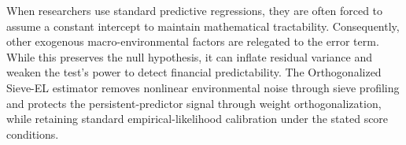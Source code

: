 \documentclass{article}
\begin{document}
When researchers use standard predictive regressions, they are often forced to assume a constant intercept to maintain mathematical tractability. Consequently, other exogenous macro-environmental factors are relegated to the error term. While this preserves the null hypothesis, it can inflate residual variance and weaken the test's power to detect financial predictability. The Orthogonalized Sieve-EL estimator removes nonlinear environmental noise through sieve profiling and protects the persistent-predictor signal through weight orthogonalization, while retaining standard empirical-likelihood calibration under the stated score conditions.
\end{document}
